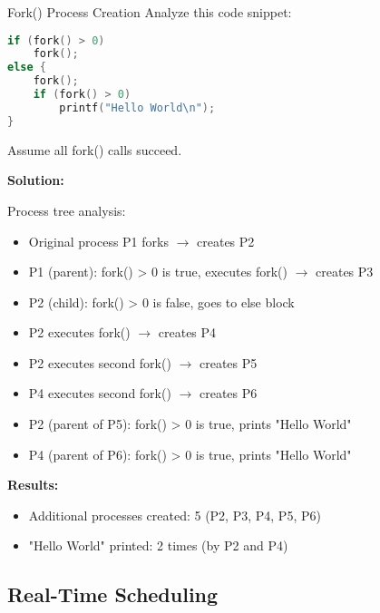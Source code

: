 \begin{example2}{Fork() Process Creation}
    Analyze this code snippet:
    
\begin{lstlisting}[language=C, style=basesmol]
if (fork() > 0)
    fork();
else {
    fork();
    if (fork() > 0)
        printf("Hello World\n");
}
\end{lstlisting}

    Assume all fork() calls succeed.
    
    \tcblower
    
    \textbf{Solution:}
    
    Process tree analysis:
    \begin{itemize}
        \item Original process P1 forks $\rightarrow$ creates P2
        \item P1 (parent): fork() > 0 is true, executes fork() $\rightarrow$ creates P3
        \item P2 (child): fork() > 0 is false, goes to else block
        \item P2 executes fork() $\rightarrow$ creates P4
        \item P2 executes second fork() $\rightarrow$ creates P5 
        \item P4 executes second fork() $\rightarrow$ creates P6
        \item P2 (parent of P5): fork() > 0 is true, prints "Hello World"
        \item P4 (parent of P6): fork() > 0 is true, prints "Hello World"
    \end{itemize}
    
    \textbf{Results:}
    \begin{itemize}
        \item Additional processes created: 5 (P2, P3, P4, P5, P6)
        \item "Hello World" printed: 2 times (by P2 and P4)
    \end{itemize}
\end{example2}

\subsection{Real-Time Scheduling}

